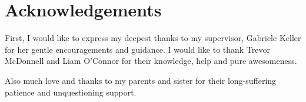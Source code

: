\chapter*{Acknowledgements}\label{ack}

First, I would like to express my deepest thanks to my supervisor, Gabriele Keller for her gentle encouragements and guidance. I would like to thank Trevor McDonnell and Liam O'Connor for their knowledge, help and pure awesomeness. 

Also much love and thanks to my parents and sister for their long-suffering patience and unquestioning support.